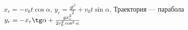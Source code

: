$x_{r}=-v_{0}t\cos\alpha$, $y_{r}=\frac{gt^2}{2}+v_{0}t\sin\alpha$. 
Траектория --- парабола
$y_{r}=-x_{r}\tg\alpha+\frac{gx^2_{r}}{2v^2_{0}\cos^2\alpha}$
